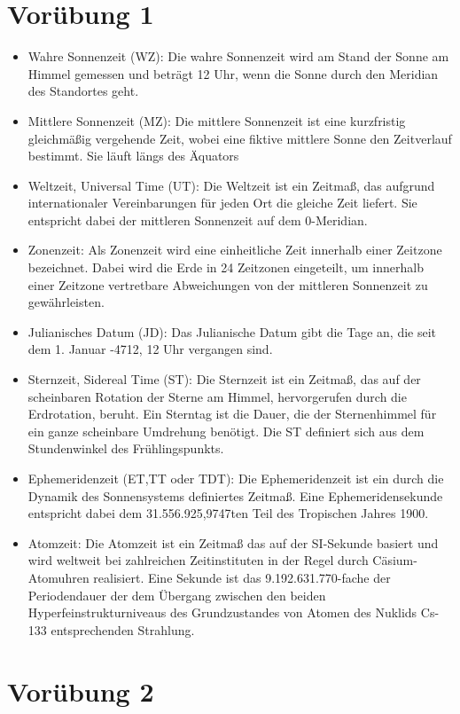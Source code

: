 \documentclass[titlepage]{scrartcl}
\begin{document}
\section{Vorübung 1}

\begin{itemize}
\item Wahre Sonnenzeit (WZ): Die wahre Sonnenzeit wird am Stand der Sonne am Himmel gemessen und beträgt 12 Uhr, wenn die Sonne durch den Meridian des Standortes geht.
\item Mittlere Sonnenzeit (MZ): Die mittlere Sonnenzeit ist eine kurzfristig gleichmäßig vergehende Zeit, wobei eine fiktive mittlere Sonne den Zeitverlauf bestimmt. Sie läuft längs des Äquators
\item Weltzeit, Universal Time (UT): Die Weltzeit ist ein Zeitmaß, das aufgrund internationaler Vereinbarungen für jeden Ort die gleiche Zeit liefert. Sie entspricht dabei der mittleren Sonnenzeit auf dem 0-Meridian.
\item Zonenzeit: Als Zonenzeit wird eine einheitliche Zeit innerhalb einer Zeitzone bezeichnet. Dabei wird die Erde in 24 Zeitzonen eingeteilt, um innerhalb einer Zeitzone vertretbare Abweichungen von der mittleren Sonnenzeit zu gewährleisten.
\item Julianisches Datum (JD): Das Julianische Datum gibt die Tage an, die seit dem 1. Januar -4712, 12 Uhr vergangen sind.
\item Sternzeit, Sidereal Time (ST): Die Sternzeit ist ein Zeitmaß, das auf der scheinbaren Rotation der Sterne am Himmel, hervorgerufen durch die Erdrotation, beruht. Ein Sterntag ist die Dauer, die der Sternenhimmel für ein ganze scheinbare Umdrehung benötigt. Die ST definiert sich aus dem Stundenwinkel des Frühlingspunkts.
\item Ephemeridenzeit (ET,TT oder TDT): Die Ephemeridenzeit ist ein durch die Dynamik des Sonnensystems definiertes Zeitmaß. Eine Ephemeridensekunde entspricht dabei dem 31.556.925,9747ten Teil des Tropischen Jahres 1900. 
\item Atomzeit: Die Atomzeit ist ein Zeitmaß das auf der SI-Sekunde basiert und wird weltweit bei zahlreichen Zeitinstituten in der Regel durch Cäsium-Atomuhren realisiert. Eine Sekunde ist das 9.192.631.770-fache der Periodendauer der dem Übergang zwischen den beiden Hyperfeinstrukturniveaus des Grundzustandes von Atomen des Nuklids Cs-133 entsprechenden Strahlung.
\end{itemize}

\section{Vorübung 2}
\end{document}

